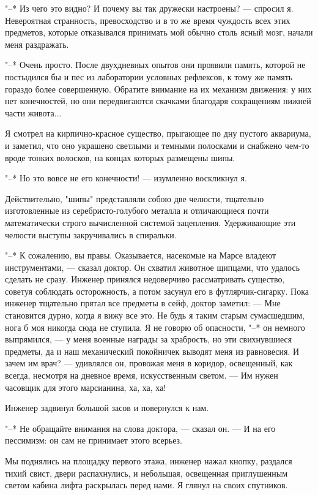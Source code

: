 "--* Из чего это видно? И почему вы так дружески настроены? ---  спросил  я.
Невероятная странность, превосходство и в то же время чуждость  всех  этих
предметов, которые отказывался принимать  мой  обычно  столь  ясный  мозг,
начали меня раздражать.

"--* Очень просто. После двухдневных опытов они проявили  память,  которой
не постыдился бы и пес из лаборатории условных рефлексов, к тому же память
гораздо более совершенную. Обратите внимание на их  механизм  движения:  у
них нет конечностей, но они передвигаются скачками  благодаря  сокращениям
нижней части живота...

Я смотрел  на  кирпично-красное  существо,  прыгающее  по  дну  пустого
аквариума, и заметил, что оно украшено  светлыми  и  темными  полосками  и
снабжено чем-то вроде тонких волосков, на концах которых размещены шипы.

"--* Но это вовсе не его конечности! --- изумленно воскликнул я.

Действительно,  "шипы"  представляли  собою  две   челюсти,   тщательно
изготовленные  из  серебристо-голубого  металла   и   отличающиеся   почти
математически строго вычисленной  системой  зацепления.  Удерживающие  эти
челюсти выступы закручивались в спиральки.

"--* К сожалению,  вы  правы.  Оказывается,  насекомые  на  Марсе  владеют
инструментами, --- сказал доктор. Он схватил животное щипцами,  что  удалось
сделать не сразу. Инженер  принялся  недоверчиво  рассматривать  существо,
советуя соблюдать осторожность, а потом засунул его  в  футлярчик-сигарку.
Пока инженер тщательно прятал все предметы в сейф, доктор заметил:  ---  Мне
становится  дурно,  когда  я  вижу  все  это.  Не  будь  я  таким   старым
сумасшедшим, нога б моя никогда сюда не ступила. Я не говорю об опасности,
"--* он немного выпрямился, --- у меня военные награды  за  храбрость,  но  эти
свихнувшиеся предметы, да и наш механический покойничек  выводят  меня  из
равновесия. И зачем им врач? --- удивлялся  он,  провожая  меня  в  коридор,
освещенный, как всегда, несмотря на дневное время, искусственным светом. ---
Им нужен часовщик для этого марсианина, ха, ха, ха!

Инженер задвинул большой засов и повернулся к нам.

"--* Не обращайте внимания на слова доктора, ---  сказал  он.  ---  И  на  его
пессимизм: он сам не принимает этого всерьез.

Мы поднялись на площадку первого этажа, инженер нажал кнопку,  раздался
тихий свист, двери  распахнулись,  и  небольшая,  освещенная  приглушенным
светом кабина лифта раскрылась перед нами. Я глянул на своих спутников.

